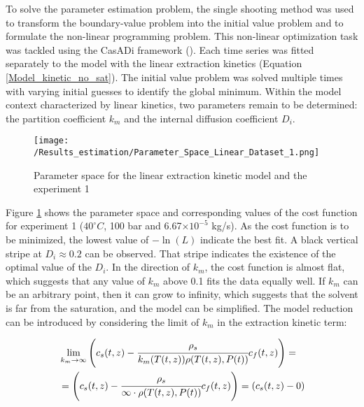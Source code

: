 \documentclass[../Supercritical_fluid_extraction_of_essential_oil_from_chamomile.tex]{subfiles}
\begin{document}
	
	\label{CH: Results}
	
	To solve the parameter estimation problem, the single shooting method was used to transform the boundary-value problem into the initial value problem and to formulate the non-linear programming problem. This non-linear optimization task was tackled using the CasADi framework (\citet{Andersson2018}). Each time series was fitted separately to the model with the linear extraction kinetics (Equation \ref{Model_kinetic_no_sat}). The initial value problem was solved multiple times with varying initial guesses to identify the global minimum. Within the model context characterized by linear kinetics, two parameters remain to be determined: the partition coefficient $k_m$ and the internal diffusion coefficient $D_i$. 
	
	\begin{figure}[!h]
		\centering
		\texttt{[image: /Results\_estimation/Parameter\_Space\_Linear\_Dataset\_1.png]}
		\caption{Parameter space for the linear extraction kinetic model and the experiment 1}
		\label{fig: Fit_1_linear}
	\end{figure}
	
	Figure \ref{fig: Fit_1_linear} shows the parameter space and corresponding values of the cost function for experiment 1 ($40^\circ C$, 100 bar and 6.67$\times 10^{-5}$ kg/s). As the cost function is to be minimized, the lowest value of $-\ln(L)$ indicate the best fit. A black vertical stripe at $D_i \approx 0.2$ can be observed. That stripe indicates the existence of the optimal value of the $D_i$. In the direction of $k_m$, the cost function is almost flat, which suggests that any value of $k_m$ above 0.1 fits the data equally well. If $k_m$ can be an arbitrary point, then it can grow to infinity, which suggests that the solvent is far from the saturation, and the model can be simplified. The model reduction can be introduced by considering the limit of $k_m$ in the extraction kinetic term: 
	
	{\footnotesize
		\begin{equation*}
			\begin{split}
				&\lim_{k_m \rightarrow \infty} \left({\color{black}{\color{black} c_s} }(t,z)  - \cfrac{{\color{black}\rho_s}}{{\color{black}k_m}({\color{black}T}(t,z)){\color{black}\rho}({\color{black}T}(t,z),{\color{black}P}(t))}  {\color{black}c_f}(t,z) \right)  = \\
				&= \left({\color{black}{\color{black} c_s} }(t,z)  - \cfrac{\rho_s}{\infty \cdot \rho(T(t,z),P(t))}  {c_f}(t,z) \right) = \left(c_s(t,z) - 0 \right)
			\end{split}
	\end{equation*} }
	
\end{document}
